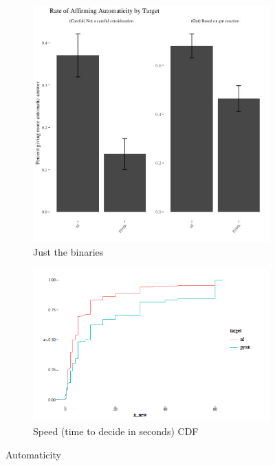 \documentclass[12pt,letterpaper]{article}
\begin{document}
\begin{figure}
\begin{subfigure}{.5\textwidth}
        \includegraphics[width=1\linewidth]{Output/Graphs/Experiments/Automaticity/bar chart binary measures.jpg} 
        \caption{Just the binaries}
        \label{fig:sub-first}
    \end{subfigure}
    \begin{subfigure}{1\textwidth}
        \centering
        \includegraphics[width=.5\linewidth]{Output/Graphs/Experiments/Automaticity/speed cdf.png}  
        \caption{Speed (time to decide in seconds) CDF}
        \label{fig:sub-second}
    \end{subfigure}
\caption{Automaticity}
\end{figure}
\end{document}
